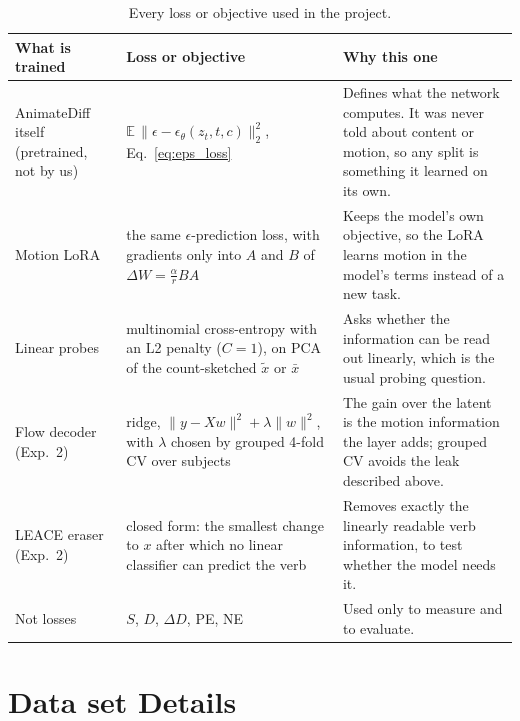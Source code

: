 \documentclass[twoside,english]{article}
\newcommand{\xs}{\bar{x}}         %
\newcommand{\xd}{\tilde{x}}       %
\newcommand{\dD}{\Delta D}
\begin{document}
\begin{table}[!h]
\centering
\small
\begin{tabular}{p{3.0cm}p{6.2cm}p{6.0cm}}
\toprule
What is trained & Loss or objective & Why this one \\
\midrule
AnimateDiff itself (pretrained, not by us) & $\mathbb{E}\,\|\epsilon - \epsilon_\theta(z_t,t,c)\|_2^2$, Eq.~\eqref{eq:eps_loss} &
  Defines what the network computes. It was never told about content or motion, so any split is something it learned on its own. \\
Motion LoRA & the same $\epsilon$-prediction loss, with gradients only into $A$ and $B$ of $\Delta W = \frac{\alpha}{r}BA$ &
  Keeps the model's own objective, so the LoRA learns motion in the model's terms instead of a new task. \\
Linear probes & multinomial cross-entropy with an L2 penalty ($C = 1$), on PCA of the count-sketched $\xd$ or $\xs$ &
  Asks whether the information can be read out linearly, which is the usual probing question. \\
Flow decoder (Exp.~2) & ridge, $\|y - Xw\|^2 + \lambda\|w\|^2$, with $\lambda$ chosen by grouped 4-fold CV over subjects &
  The gain over the latent is the motion information the layer adds; grouped CV avoids the leak described above. \\
LEACE eraser (Exp.~2) & closed form: the smallest change to $x$ after which no linear classifier can predict the verb &
  Removes exactly the linearly readable verb information, to test whether the model needs it. \\
\midrule
Not losses & $S$, $D$, $\dD$, PE, NE & Used only to measure and to evaluate. \\
\bottomrule
\end{tabular}
\caption{Every loss or objective used in the project.}
\label{tab:losses}
\end{table}

\section{Data set Details} \label{sec:data}
\end{document}
